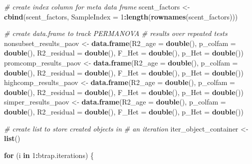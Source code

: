 \documentclass[]{article}
\newenvironment{Shaded}{\begin{snugshade}}{\end{snugshade}}
\newcommand{\KeywordTok}[1]{\textcolor[rgb]{0.13,0.29,0.53}{\textbf{#1}}}
\newcommand{\DataTypeTok}[1]{\textcolor[rgb]{0.13,0.29,0.53}{#1}}
\newcommand{\DecValTok}[1]{\textcolor[rgb]{0.00,0.00,0.81}{#1}}
\newcommand{\StringTok}[1]{\textcolor[rgb]{0.31,0.60,0.02}{#1}}
\newcommand{\CommentTok}[1]{\textcolor[rgb]{0.56,0.35,0.01}{\textit{#1}}}
\newcommand{\ControlFlowTok}[1]{\textcolor[rgb]{0.13,0.29,0.53}{\textbf{#1}}}
\newcommand{\OperatorTok}[1]{\textcolor[rgb]{0.81,0.36,0.00}{\textbf{#1}}}
\newcommand{\NormalTok}[1]{#1}
\begin{document}
\begin{Shaded}
\begin{Highlighting}[]
    \CommentTok{# create index column for meta data frame}
\NormalTok{    scent_factors <-}\StringTok{ }\KeywordTok{cbind}\NormalTok{(scent_factors, }
        \DataTypeTok{SampleIndex =} \DecValTok{1}\OperatorTok{:}\KeywordTok{length}\NormalTok{(}\KeywordTok{rownames}\NormalTok{(scent_factors)))}
    
    
    \CommentTok{# create data.frame to track PERMANOVA}
    \CommentTok{# results over repeated tests}
\NormalTok{    nonsubset_results_paov <-}\StringTok{ }\KeywordTok{data.frame}\NormalTok{(}\DataTypeTok{R2_age =} \KeywordTok{double}\NormalTok{(), }
        \DataTypeTok{p_colfam =} \KeywordTok{double}\NormalTok{(), }\DataTypeTok{R2_residual =} \KeywordTok{double}\NormalTok{(), }
        \DataTypeTok{F_Het =} \KeywordTok{double}\NormalTok{(), }\DataTypeTok{p_Het =} \KeywordTok{double}\NormalTok{())}
\NormalTok{    promcomp_results_paov <-}\StringTok{ }\KeywordTok{data.frame}\NormalTok{(}\DataTypeTok{R2_age =} \KeywordTok{double}\NormalTok{(), }
        \DataTypeTok{p_colfam =} \KeywordTok{double}\NormalTok{(), }\DataTypeTok{R2_residual =} \KeywordTok{double}\NormalTok{(), }
        \DataTypeTok{F_Het =} \KeywordTok{double}\NormalTok{(), }\DataTypeTok{p_Het =} \KeywordTok{double}\NormalTok{())}
\NormalTok{    highcomp_results_paov <-}\StringTok{ }\KeywordTok{data.frame}\NormalTok{(}\DataTypeTok{R2_age =} \KeywordTok{double}\NormalTok{(), }
        \DataTypeTok{p_colfam =} \KeywordTok{double}\NormalTok{(), }\DataTypeTok{R2_residual =} \KeywordTok{double}\NormalTok{(), }
        \DataTypeTok{F_Het =} \KeywordTok{double}\NormalTok{(), }\DataTypeTok{p_Het =} \KeywordTok{double}\NormalTok{())}
\NormalTok{    simper_results_paov <-}\StringTok{ }\KeywordTok{data.frame}\NormalTok{(}\DataTypeTok{R2_age =} \KeywordTok{double}\NormalTok{(), }
        \DataTypeTok{p_colfam =} \KeywordTok{double}\NormalTok{(), }\DataTypeTok{R2_residual =} \KeywordTok{double}\NormalTok{(), }
        \DataTypeTok{F_Het =} \KeywordTok{double}\NormalTok{(), }\DataTypeTok{p_Het =} \KeywordTok{double}\NormalTok{())}
    
    \CommentTok{# create list to store created objects in}
    \CommentTok{# an iteration}
\NormalTok{    iter_object_container <-}\StringTok{ }\KeywordTok{list}\NormalTok{()}
    
    \ControlFlowTok{for}\NormalTok{ (i }\ControlFlowTok{in} \DecValTok{1}\OperatorTok{:}\NormalTok{btrap.iterations) \{}
        

\end{Highlighting}
\end{Shaded}
\end{document}
